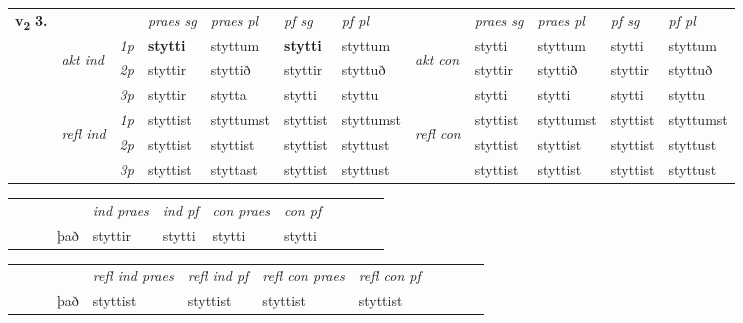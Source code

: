\begin{tabular}{llllllllllll} \toprule
\multirow{4}{*}{{{\textbf{v{\textsubscript{2}}} \Large{\textbf{3.}}}}}  & &   &  \textit{praes sg}  & \textit{praes pl}  &\textit{ pf sg} & \textit{pf pl} &  &  \textit{praes sg}  & \textit{praes pl}  & \textit{pf sg} & \textit{pf pl } \\*
	\cmidrule{4-7} \cmidrule{9-12}
 & \multirow{3}{*}{\begin{turn}{90}\textit{akt ind}\end{turn}} & {\textit{1p}} & \textbf{stytti} & styttum    & \textbf{stytti} & styttum & \multirow{3}{*}{\begin{turn}{90}\textit{akt con}\end{turn}} &stytti & styttum & stytti & styttum\\*
& &  {\textit{2p}} &  styttir  & styttið   & styttir & styttuð & & styttir & styttið & styttir & styttuð \\*
& &  {\textit{3p}} & styttir & stytta   & stytti & styttu & & stytti & stytti& stytti & styttu  \\*
\cmidrule{4-7} \cmidrule{9-12}
 &\multirow{3}{*}{\begin{turn}{90}\textit{refl ind}\end{turn}} & {\textit{1p}} & styttist & styttumst    & styttist & styttumst & \multirow{3}{*}{\begin{turn}{90}\textit{refl con}\end{turn}}  &styttist & styttumst & styttist & styttumst\\*
 &&  {\textit{2p}} &  styttist  & styttist   & styttist & styttust & &styttist & styttist & styttist & styttust \\*
& &  {\textit{3p}} & styttist & styttast   & styttist & styttust & & styttist & styttist& styttist & styttust  \\*
\cmidrule{4-7} \cmidrule{9-12}
\end{tabular}


\begin{tabular}{llllllllllll}
 & &  & &  \textit{ind praes} & \textit{ind pf} & \textit{con praes} & \textit{con pf} \\*
&  & & það & styttir & stytti & stytti & stytti \\*
\cmidrule{5-9}
\end{tabular}


\begin{tabular}{llllllllllll}
 & &  & &  \textit{refl ind praes} & \textit{refl ind pf} & \textit{refl con praes} & \textit{refl con pf} \\*
 & &  & það & styttist & styttist & styttist & styttist \\*
\cmidrule{5-9}
\end{tabular}


